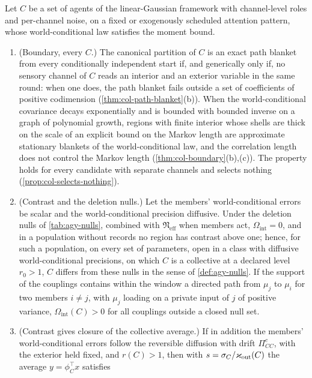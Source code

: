 \begin{theorem}\label{thm:agy-h1}
Let $C$ be a set of agents of the linear-Gaussian framework with channel-level roles and per-channel noise, on a fixed or exogenously scheduled attention pattern, whose world-conditional law satisfies the moment bound.
\begin{enumerate}
\item[(a)] (Boundary, every $C$.) The canonical partition of $C$ is an exact path blanket from every conditionally independent start if, and generically only if, no sensory channel of $C$ reads an interior and an exterior variable in the same round: when one does, the path blanket fails outside a set of coefficients of positive codimension (\cref{thm:col-path-blanket}(b)). When the world-conditional covariance decays exponentially and is bounded with bounded inverse on a graph of polynomial growth, regions with finite interior whose shells are thick on the scale of an explicit bound on the Markov length are approximate stationary blankets of the world-conditional law, and the correlation length does not control the Markov length (\cref{thm:col-boundary}(b),(c)). The property holds for every candidate with separate channels and selects nothing (\cref{prop:col-selects-nothing}).
\item[(b)] (Contrast and the deletion nulls.) Let the members' world-conditional errors be scalar and the world-conditional precision diffusive. Under the deletion nulls of \cref{tab:agy-nulls}, combined with $\mathfrak N_{\mathrm{eff}}$ when members act, $\Omega_{\mathrm{int}}=0$, and in a population without records no region has contrast above one; hence, for such a population, on every set of parameters, open in a class with diffusive world-conditional precisions, on which $C$ is a collective at a declared level $r_0>1$, $C$ differs from these nulls in the sense of \cref{def:agy-nulls}. If the support of the couplings contains within the window a directed path from $\mu_j$ to $\mu_i$ for two members $i\ne j$, with $\mu_j$ loading on a private input of $j$ of positive variance, $\Omega_{\mathrm{int}}(C)>0$ for all couplings outside a closed null set.
\item[(c)] (Contrast gives closure of the collective average.) If in addition the members' world-conditional errors follow the reversible diffusion with drift $\Pi^c_{CC}$, with the exterior held fixed, and $r(C)>1$, then with $s=\sigma_C/\varkappa_{\mathrm{out}}(C)$ the average $y=\phi_C^\top x$ satisfies
\begin{equation}\label{eq:agy-h1-closure}

\end{equation}
\end{enumerate}
\end{theorem}

